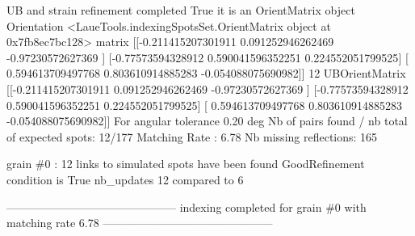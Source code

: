 \documentclass[letterpaper,10pt,english]{sphinxmanual}
\begin{document}
\begin{sphinxalltt}
UB and strain refinement completed
True it is an OrientMatrix object
Orientation \textless{}LaueTools.indexingSpotsSet.OrientMatrix object at 0x7fb8ec7bc128\textgreater{}
matrix {[}{[}-0.211415207301911  0.091252946262469 -0.97230572627369 {]}
 {[}-0.77573594328912   0.590041596352251  0.224552051799525{]}
 {[} 0.594613709497768  0.803610914885283 -0.054088075690982{]}{]}
 12
UBOrientMatrix {[}{[}-0.211415207301911  0.091252946262469 -0.97230572627369 {]}
 {[}-0.77573594328912   0.590041596352251  0.224552051799525{]}
 {[} 0.594613709497768  0.803610914885283 -0.054088075690982{]}{]}
For angular tolerance 0.20 deg
Nb of pairs found / nb total of expected spots: 12/177
Matching Rate : 6.78
Nb missing reflections: 165

grain \#0 : 12 links to simulated spots have been found
GoodRefinement condition is  True
nb\_updates 12 compared to 6

---------------------------------------------
indexing completed for grain \#0 with matching rate 6.78
---------------------------------------------


\end{sphinxalltt}
\end{document}
